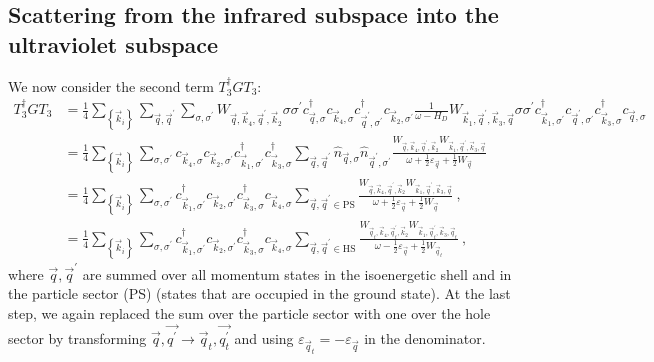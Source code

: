 \documentclass{revtex4-2}
\begin{document}
\subsection{Scattering from the infrared subspace into the ultraviolet subspace}
We now consider the second term \(T_3^\dagger G T_3\):
\begin{equation}\begin{aligned}
	T_3^\dagger G T_3 &= \frac{1}{4}\sum_{\left\{ \vec k_i \right\} }\sum_{\vec q,\vec q^\prime}\sum_{\sigma,\sigma^\prime} W_{\vec q,\vec k_4, \vec q^\prime, \vec k_2} \sigma\sigma^\prime c^\dagger_{\vec q,\sigma}c_{\vec k_4,\sigma}c^\dagger_{\vec q^\prime,\sigma^\prime}c_{\vec k_2,\sigma^\prime} \frac{1}{\omega - H_D} W_{\vec k_1,\vec q^\prime, \vec k_3, \vec q} \sigma\sigma^\prime c^\dagger_{\vec k_1,\sigma^\prime} c_{\vec q^\prime,\sigma^\prime} c^\dagger_{\vec k_3,\sigma} c_{\vec q,\sigma}\\
			  &= \frac{1}{4}\sum_{\left\{ \vec k_i \right\}}\sum_{\sigma,\sigma^\prime}   c_{\vec k_4,\sigma} c_{\vec k_2,\sigma^\prime} c^\dagger_{\vec k_1,\sigma^\prime} c^\dagger_{\vec k_3,\sigma} \sum_{\vec q,\vec q^\prime}\hat n_{\vec q,\sigma} \hat n_{\vec q^\prime,\sigma^\prime}\frac{W_{\vec q,\vec k_4, \vec q^\prime, \vec k_2} W_{\vec k_1,\vec q^\prime, \vec k_3, \vec q}}{\omega + \frac{1}{2}\varepsilon_{\vec q} + \frac{1}{2}W_{\vec q}}\\
			  &= \frac{1}{4}\sum_{\left\{ \vec k_i \right\}}\sum_{\sigma,\sigma^\prime} c^\dagger_{\vec k_1,\sigma^\prime} c_{\vec k_2,\sigma^\prime} c^\dagger_{\vec k_3,\sigma}c_{\vec k_4,\sigma}  \sum_{\vec q, \vec q^\prime \in \text{PS}}\frac{W_{\vec q,\vec k_4, \vec q^\prime, \vec k_2} W_{\vec k_1,\vec q^\prime, \vec k_3, \vec q}}{\omega + \frac{1}{2}\varepsilon_{\vec q} + \frac{1}{2}W_{\vec q}}~,\\
			  &= \frac{1}{4}\sum_{\left\{ \vec k_i \right\}}\sum_{\sigma,\sigma^\prime} c^\dagger_{\vec k_1,\sigma^\prime} c_{\vec k_2,\sigma^\prime} c^\dagger_{\vec k_3,\sigma}c_{\vec k_4,\sigma}  \sum_{\vec q, \vec q^\prime \in \text{HS}}\frac{W_{\vec q_t,\vec k_4, \vec q_t^\prime, \vec k_2} W_{\vec k_1,\vec q_t^\prime, \vec k_3, \vec q_t}}{\omega - \frac{1}{2}\varepsilon_{\vec q} + \frac{1}{2}W_{\vec q_t}}~,
\end{aligned}\end{equation}
where \(\vec q, \vec q^\prime\) are summed over all momentum states in the isoenergetic shell and in the particle sector (PS) (states that are occupied in the ground state). At the last step, we again replaced the sum over the particle sector with one over the hole sector by transforming \(\vec q,\vec{q^\prime} \to \vec q_t,\vec{q_t^\prime}\) and using \(\varepsilon_{\vec q_t} = -\varepsilon_{\vec q}\) in the denominator.
\end{document}
